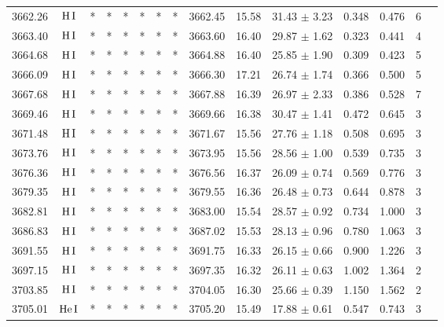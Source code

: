 \documentclass{article}
\begin{document}
\begin{table*}
\begin{adjustbox}{width=\textwidth}
\begin{tabular}{ccccccccccccccc}
3662.26 & $\mbox{H}\thinspace \mbox{I}$ & * & * & * & * & * & * & 3662.45 & 15.58 & 31.43 $\pm$ 3.23 & 0.348 & 0.476 & 6 &  \\
3663.40 & $\mbox{H}\thinspace \mbox{I}$ & * & * & * & * & * & * & 3663.60 & 16.40 & 29.87 $\pm$ 1.62 & 0.323 & 0.441 & 4 &  \\
3664.68 & $\mbox{H}\thinspace \mbox{I}$ & * & * & * & * & * & * & 3664.88 & 16.40 & 25.85 $\pm$ 1.90 & 0.309 & 0.423 & 5 &  \\
3666.09 & $\mbox{H}\thinspace \mbox{I}$ & * & * & * & * & * & * & 3666.30 & 17.21 & 26.74 $\pm$ 1.74 & 0.366 & 0.500 & 5 &  \\
3667.68 & $\mbox{H}\thinspace \mbox{I}$ & * & * & * & * & * & * & 3667.88 & 16.39 & 26.97 $\pm$ 2.33 & 0.386 & 0.528 & 7 &  \\
3669.46 & $\mbox{H}\thinspace \mbox{I}$ & * & * & * & * & * & * & 3669.66 & 16.38 & 30.47 $\pm$ 1.41 & 0.472 & 0.645 & 3 &  \\
3671.48 & $\mbox{H}\thinspace \mbox{I}$ & * & * & * & * & * & * & 3671.67 & 15.56 & 27.76 $\pm$ 1.18 & 0.508 & 0.695 & 3 &  \\
3673.76 & $\mbox{H}\thinspace \mbox{I}$ & * & * & * & * & * & * & 3673.95 & 15.56 & 28.56 $\pm$ 1.00 & 0.539 & 0.735 & 3 &  \\
3676.36 & $\mbox{H}\thinspace \mbox{I}$ & * & * & * & * & * & * & 3676.56 & 16.37 & 26.09 $\pm$ 0.74 & 0.569 & 0.776 & 3 &  \\
3679.35 & $\mbox{H}\thinspace \mbox{I}$ & * & * & * & * & * & * & 3679.55 & 16.36 & 26.48 $\pm$ 0.73 & 0.644 & 0.878 & 3 &  \\
3682.81 & $\mbox{H}\thinspace \mbox{I}$ & * & * & * & * & * & * & 3683.00 & 15.54 & 28.57 $\pm$ 0.92 & 0.734 & 1.000 & 3 &  \\
3686.83 & $\mbox{H}\thinspace \mbox{I}$ & * & * & * & * & * & * & 3687.02 & 15.53 & 28.13 $\pm$ 0.96 & 0.780 & 1.063 & 3 &  \\
3691.55 & $\mbox{H}\thinspace \mbox{I}$ & * & * & * & * & * & * & 3691.75 & 16.33 & 26.15 $\pm$ 0.66 & 0.900 & 1.226 & 3 &  \\
3697.15 & $\mbox{H}\thinspace \mbox{I}$ & * & * & * & * & * & * & 3697.35 & 16.32 & 26.11 $\pm$ 0.63 & 1.002 & 1.364 & 2 &  \\
3703.85 & $\mbox{H}\thinspace \mbox{I}$ & * & * & * & * & * & * & 3704.05 & 16.30 & 25.66 $\pm$ 0.39 & 1.150 & 1.562 & 2 &  \\
3705.01 & $\mbox{He}\thinspace \mbox{I}$ & * & * & * & * & * & * & 3705.20 & 15.49 & 17.88 $\pm$ 0.61 & 0.547 & 0.743 & 3 &  \\

\end{tabular}
\end{adjustbox}
\end{table*}
\end{document}
